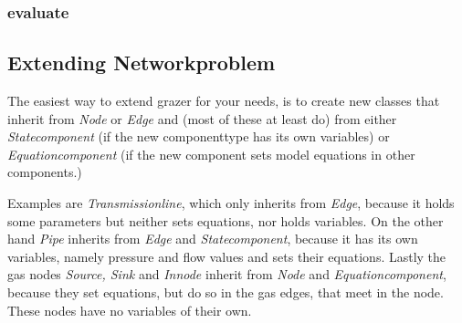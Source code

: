 \documentclass[a4paper]{article}
\begin{document}
\subsubsection*{evaluate}

\subsection{Extending Networkproblem}
\label{sec:extend-netw}
The easiest way to extend grazer for your needs, is to create new classes that inherit from \emph{Node} or \emph{Edge} and
(most of these at least do) from either \emph{Statecomponent} (if the new componenttype has its own variables) or
\emph{Equationcomponent} (if the new component sets model equations in other components.)

Examples are \emph{Transmissionline}, which only inherits from \emph{Edge}, because it holds some parameters but neither sets equations, nor holds variables.
On the other hand \emph{Pipe} inherits from \emph{Edge} and \emph{Statecomponent}, because it has its own variables, namely pressure and flow values and sets their equations.
Lastly the gas nodes \emph{Source, Sink} and \emph{Innode} inherit from \emph{Node} and \emph{Equationcomponent}, because they set equations, but do so in the gas edges, that meet in the node. These nodes have no variables of their own.
\end{document}
